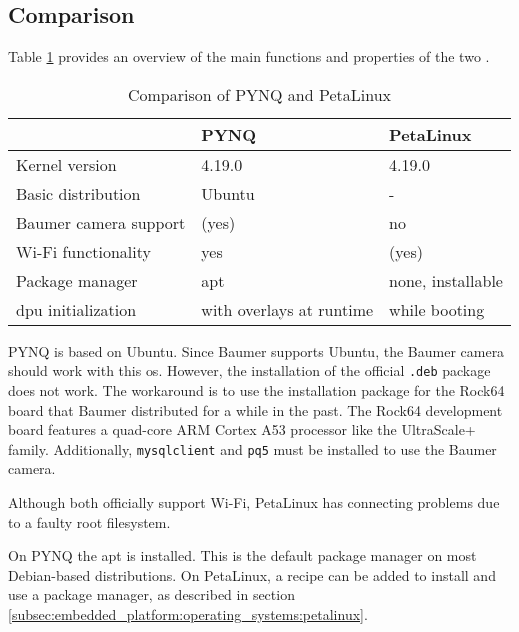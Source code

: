 \subsection{Comparison}
\label{subsec:embedded_platform:operating_systems:comparison}
Table \ref{tab:compare_os} provides an overview of the main functions and properties of the two .

\begin{table}
  \caption{Comparison of PYNQ and PetaLinux}
  \label{tab:compare_os}
  \centering
  \begin{tabular}{lll}
    \toprule
    \textbf{} & \textbf{PYNQ} & \textbf{PetaLinux} \\
    \midrule
    Kernel version & 4.19.0 & 4.19.0 \\
    Basic distribution & Ubuntu \cite{pynq_presentation} & - \\
    Baumer camera support & (yes) \cite{baumer_prog_guide} & no \\
    Wi-Fi functionality & yes & (yes) \\
    Package manager & \acrshort{apt} & none, installable \\
    \acrshort{dpu} initialization & with overlays at runtime \cite{pynq_overlays} & while booting \cite{petalinux_user_guide} \\
    \bottomrule
  \end{tabular}
\end{table}

PYNQ is based on Ubuntu.
Since Baumer supports Ubuntu, the Baumer camera should work with this \acrlong{os}.
However, the installation of the official \texttt{.deb} package does not work.
The workaround is to use the installation package for the Rock64 board that Baumer distributed for a while in the past.
The Rock64 development board features a quad-core ARM Cortex A53 processor like the UltraScale+ family.
Additionally, \texttt{mysqlclient} and \texttt{pq5} must be installed to use the Baumer camera.

Although both  officially support Wi-Fi, PetaLinux has connecting problems due to a faulty root filesystem.

On PYNQ the \acrfull{apt} is installed.
This is the default package manager on most Debian-based distributions.
On PetaLinux, a recipe can be added to install and use a package manager, as described in section \ref{subsec:embedded_platform:operating_systems:petalinux}.

